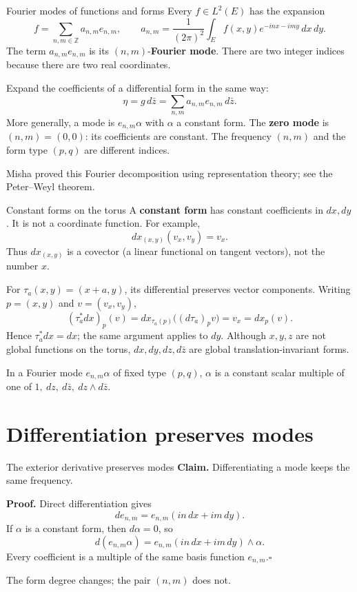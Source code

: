 \documentclass[aspectratio=169,11pt]{beamer}
\newcommand{\Z}{\mathbb Z}
\newcommand{\ee}{e_{n,m}}
\begin{document}
\begin{frame}{Fourier modes of functions and forms}
Every $f\in L^2(E)$ has the expansion
\[
 f=\sum_{n,m\in\Z}a_{n,m}\ee,\qquad
 a_{n,m}=\frac1{(2\pi)^2}\int_E f(x,y)e^{-inx-imy}\,dx\,dy.
\]
The term $a_{n,m}\ee$ is its $(n,m)$-\textbf{Fourier mode}.
There are two integer indices because there are two real coordinates.

Expand the coefficients of a differential form in the same way:
\[
 \eta=g\,d\bar z=\sum_{n,m}a_{n,m}\ee\,d\bar z.
\]
More generally, a mode is $\ee\alpha$ with $\alpha$ a constant form.
The \textbf{zero mode} is $(n,m)=(0,0)$: its coefficients are constant.
The frequency $(n,m)$ and the form type $(p,q)$ are different indices.

{\small Misha proved this Fourier decomposition using representation theory;
see the Peter--Weyl theorem.}
\end{frame}

\begin{frame}{Constant forms on the torus}
A \textbf{constant form} has constant coefficients in $dx,dy$.
It is not a coordinate function. For example,
\[
 dx_{(x,y)}(v_x,v_y)=v_x.
\]
Thus $dx_{(x,y)}$ is a covector (a linear functional on tangent vectors),
not the number $x$.

For $\tau_a(x,y)=(x+a,y)$, its differential preserves vector components.
Writing $p=(x,y)$ and $v=(v_x,v_y)$,
\[
 (\tau_a^*dx)_p(v)
 =dx_{\tau_a(p)}\bigl((d\tau_a)_p v\bigr)
 =v_x=dx_p(v).
\]
Hence $\tau_a^*dx=dx$; the same argument applies to $dy$.
Although $x,y,z$ are not global functions on the torus,
$dx,dy,dz,d\bar z$ are global translation-invariant forms.

In a Fourier mode $\ee\alpha$ of fixed type $(p,q)$,
$\alpha$ is a constant scalar multiple of one of
$1,\ dz,\ d\bar z,\ dz\wedge d\bar z$.
\end{frame}

\section{Differentiation preserves modes}
\begin{frame}{The exterior derivative preserves modes}
\textbf{Claim.} Differentiating a mode keeps the same frequency.

\textbf{Proof.} Direct differentiation gives
\[
 d\ee=\ee(in\,dx+im\,dy).
\]
If $\alpha$ is a constant form, then $d\alpha=0$, so
\[
 d(\ee\alpha)=\ee(in\,dx+im\,dy)\wedge\alpha.
\]
Every coefficient is a multiple of the same basis function $\ee$.\hfill$\square$

The form degree changes; the pair $(n,m)$ does not.
\end{frame}
\end{document}
